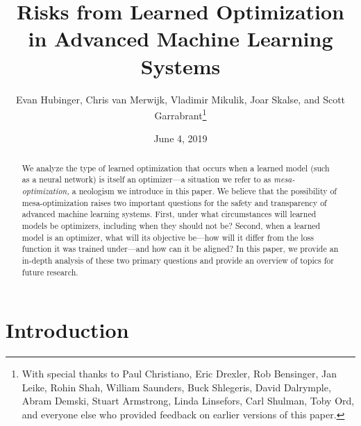 \documentclass[
  onecolumn,
  natbib,
]{miri-tech-article}
\begin{document}
\title{Risks from Learned Optimization \\ in Advanced Machine Learning Systems}
\author{Evan Hubinger, Chris van Merwijk, Vladimir Mikulik, Joar Skalse, and Scott Garrabrant\thanks{With special thanks to Paul Christiano, Eric Drexler, Rob Bensinger, Jan Leike, Rohin Shah, William Saunders, Buck Shlegeris, David Dalrymple, Abram Demski, Stuart Armstrong, Linda Linsefors, Carl Shulman, Toby Ord, and everyone else who provided feedback on earlier versions of this paper.}}

\date{June 4, 2019}


\maketitle

\begin{abstract}
We analyze the type of learned optimization that occurs when a learned model (such as a neural network) is itself an optimizer---a situation we refer to as \textit{mesa-optimization,} a neologism we introduce in this paper. We believe that the possibility of mesa-optimization raises two important questions for the safety and transparency of advanced machine learning systems. First, under what circumstances will learned models be optimizers, including when they should not be? Second, when a learned model is an optimizer, what will its objective be---how will it differ from the loss function it was trained under---and how can it be aligned? In this paper, we provide an in-depth analysis of these two primary questions and provide an overview of topics for future research.
\end{abstract}

\tableofcontents

\section{Introduction}
\label{sec:1}
\end{document}
